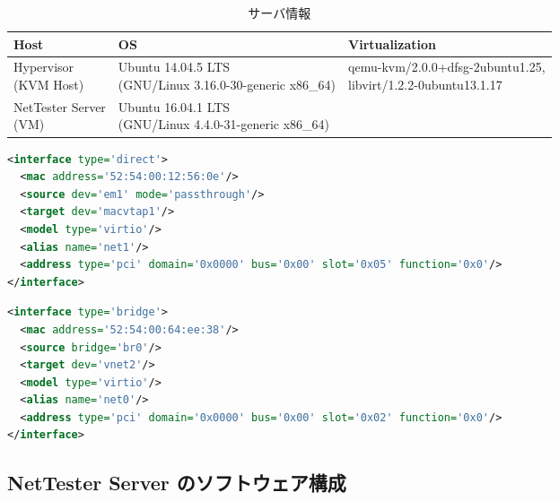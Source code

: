 \begin{table}[hb]
 \centering
 \caption{サーバ情報}
 \label{tab:server-spec}
 \begin{tabularx}{\linewidth}{l|X|X}
  \hline
  Host & OS & Virtualization \\
  \hline
  \hline
  \shortstack[l]{Hypervisor\\(KVM Host)}
    & \shortstack[l]{Ubuntu 14.04.5 LTS\\(GNU/Linux 3.16.0-30-generic x86\_64)}
    & \shortstack[l]{qemu-kvm/2.0.0+dfsg-2ubuntu1.25,\\libvirt/1.2.2-0ubuntu13.1.17} \\
  \hline
  \shortstack[l]{NetTester Server\\(VM)}
    & \shortstack[l]{Ubuntu 16.04.1 LTS\\(GNU/Linux 4.4.0-31-generic x86\_64)}
    & \\
  \hline
 \end{tabularx}
\end{table}

\begin{lstlisting}[language=xml,caption=PSW接続用ポート設定,label=lst:kvmconf-psw-port]
<interface type='direct'>
  <mac address='52:54:00:12:56:0e'/>
  <source dev='em1' mode='passthrough'/>
  <target dev='macvtap1'/>
  <model type='virtio'/>
  <alias name='net1'/>
  <address type='pci' domain='0x0000' bus='0x00' slot='0x05' function='0x0'/>
</interface>
\end{lstlisting}
\begin{lstlisting}[language=xml,caption=管理ポート設定,label=lst:kvmconf-mgmt-port]
<interface type='bridge'>
  <mac address='52:54:00:64:ee:38'/>
  <source bridge='br0'/>
  <target dev='vnet2'/>
  <model type='virtio'/>
  <alias name='net0'/>
  <address type='pci' domain='0x0000' bus='0x00' slot='0x02' function='0x0'/>
</interface>
\end{lstlisting}


  \subsection{NetTester Server のソフトウェア構成}
  \label{sec:nettester-server-software}


